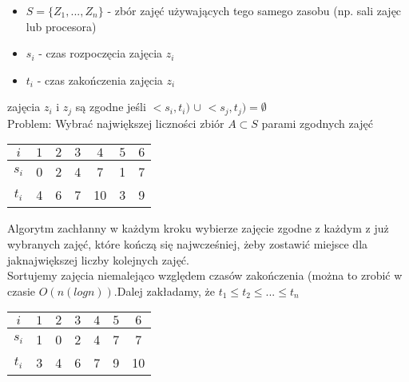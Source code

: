 \begin{itemize}
\item $S = \{ Z_1,...,Z_n \}$ - zbór zajęć używających tego samego zasobu (np. sali zajęc lub procesora) 
\item $s_i$ - czas rozpoczęcia zajęcia $z_i$
\item $t_i$ - czas zakończenia zajęcia $z_i$
\end{itemize}
zajęcia $z_i$ i $z_j$ są zgodne jeśli $<s_i,t_i)$ $\cup$ $<s_j,t_j) = \emptyset$ \\
Problem: Wybrać największej liczności zbiór $A \subset S$ parami zgodnych zajęć
\begin{center}
\begin{tabular}{ c | c | c | c | c | c | c }
  $i$ & $1$	& $2$ & $3$ & $4$ & $5$ & $6$ \\ \hline
  $s_i$ & 0	&  2  & 4 	& 7 & 1 & 7 \\ \hline
  $t_i$ & 4	&  6  & 7 	& 10 & 3 & 9 \\  
\end{tabular}
\end{center}

Algorytm zachłanny w każdym kroku wybierze zajęcie zgodne z każdym z już wybranych zajęć, które kończą się najwcześniej, żeby zostawić miejsce dla jaknajwiększej liczby kolejnych zajęć.\\
Sortujemy zajęcia niemalejąco względem czasów zakończenia (można to zrobić w czasie $O(n(logn))$.Dalej zakładamy, że $t_1 \leq t_2 \leq ... \leq t_n$

\begin{center}
\begin{tabular}{ c | c | c | c | c | c | c }
  $i$ & $1$	& $2$ & $3$ & $4$ & $5$ & $6$ \\ \hline
  $s_i$ & 1	&  0  &  2	&  4  &  7  & 7 \\ \hline
  $t_i$ & 3	&  4  &  6	&  7  &  9  & 10 \\  
\end{tabular}
\end{center}
